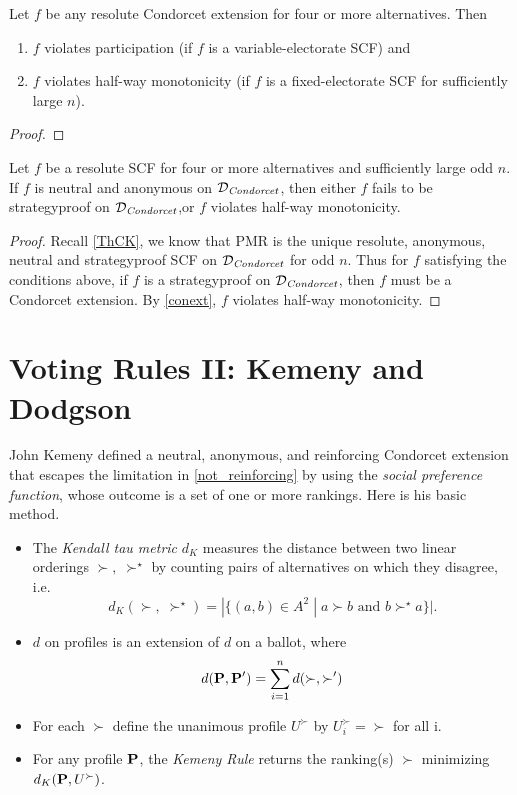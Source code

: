 \begin{theorem}
    \label{conext}
    Let $f$ be any resolute Condorcet extension for four or more alternatives. Then
    \begin{enumerate}
        \item $f$ violates participation (if $f$ is a variable-electorate SCF) and
        \item $f$ violates half-way monotonicity (if $f$ is a fixed-electorate SCF for sufficiently large $n$).
    \end{enumerate}
\end{theorem}

\begin{proof}

\end{proof}

\begin{corollary}
    Let $f$ be a resolute SCF for four or more alternatives and sufficiently large odd $n$. If $f$ is neutral and anonymous on $\mathcal{D}_\textit{Condorcet}$, then either $f$ fails to be strategyproof on $\mathcal{D}_\textit{Condorcet}$,or $f$ violates half-way monotonicity.
\end{corollary}

\begin{proof}
    Recall \cref{ThCK}, we know that PMR is the unique resolute, anonymous, neutral and strategyproof SCF on $\mathcal{D}_\textit{Condorcet}$ for odd $n$. Thus for $f$ satisfying the conditions above, if $f$ is a strategyproof on $\mathcal{D}_\textit{Condorcet}$, then $f$ must be a Condorcet extension. By \cref{conext}, $f$ violates half-way monotonicity.
\end{proof}


\section{Voting Rules II: Kemeny and Dodgson}

John Kemeny defined a neutral, anonymous, and reinforcing Condorcet extension that escapes the limitation in \cref{not_reinforcing} by using the \textit{social preference function}, whose outcome is a set of one or more rankings. Here is his basic method.

\begin{definition}
    \begin{itemize}
        \item The \emph{Kendall tau metric} $d_K$ measures the distance between two linear orderings $\succ,\;\succ^\star$ by counting pairs of alternatives on which they disagree, i.e. 
        $$d_K (\succ,\;\succ^\star) = |\{(a,b) \in A^2 \;|\; a \succ b \mbox{ and } b \succ^\star a\}|.$$
        \item $d$ on profiles is an extension of $d$ on a ballot, where
        $$d(\mathbf{P},\mathbf{P}') = \sum_{i = 1}^{n} d (\succ, \succ')$$
        \item For each $\succ$ define the unanimous profile $U^\succ$ by $U^\succ_i = \succ$ for all i.
        \item For any profile $\mathbf{P}$, the \emph{Kemeny Rule} returns the ranking(s) $\succ$ minimizing $d_K(\mathbf{P},U^\succ)$.
    \end{itemize}
\end{definition}


